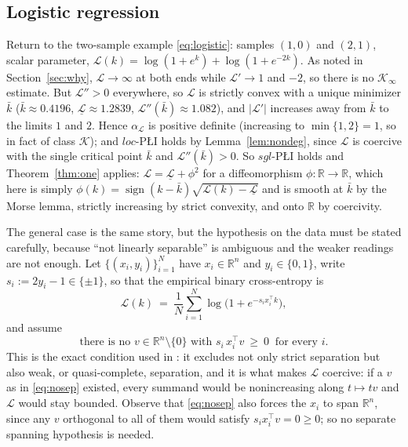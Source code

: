\documentclass[11pt]{article}
\theoremstyle{plain}
\theoremstyle{definition}
\theoremstyle{remark}
\newcommand{\R}{\mathbb{R}}
\begin{document}
\subsection{Logistic regression}

Return to the two-sample example \eqref{eq:logistic}: samples $(1,0)$ and
$(2,1)$, scalar parameter, $\mathcal{L}(k)=\log(1+e^k)+\log(1+e^{-2k})$. As noted
in Section~\ref{sec:why}, $\mathcal{L}\to\infty$ at both ends while
$\mathcal{L}'\to1$ and $-2$, so there is no $\mathcal{K}_\infty$ estimate. But
$\mathcal{L}''>0$ everywhere, so $\mathcal{L}$ is strictly convex with a unique
minimizer $\bar k$ ($\bar k\approx0.4196$,
$\underline{\mathcal{L}}\approx1.2839$, $\mathcal{L}''(\bar k)\approx1.082$), and
$|\mathcal{L}'|$ increases away from $\bar k$ to the limits $1$ and $2$. Hence
$\alpha_{\mathcal{L}}$ is positive definite (increasing to
$\min\{1,2\}=1$, so in fact of class $\mathcal{K}$); and $loc$-P\L{}I holds by
Lemma~\ref{lem:nondeg}, since $\mathcal{L}$ is coercive with the single critical
point $\bar k$ and $\mathcal{L}''(\bar k)>0$. So $sgl$-P\L{}I holds and
Theorem~\ref{thm:one} applies: $\mathcal{L}=\underline{\mathcal{L}}+\phi^2$ for a
diffeomorphism $\phi\colon\R\to\R$, which here is simply
$\phi(k)=\operatorname{sign}(k-\bar k)\sqrt{\mathcal{L}(k)-\underline{\mathcal{L}}}$
and is smooth at $\bar k$ by the Morse lemma, strictly increasing by strict
convexity, and onto $\R$ by coercivity.

The general case is the same story, but the hypothesis on the data must be stated
carefully, because ``not linearly separable'' is ambiguous and the weaker readings
are not enough. Let $\{(x_i,y_i)\}_{i=1}^N$ have $x_i\in\R^n$ and
$y_i\in\{0,1\}$, write $s_i := 2y_i-1\in\{\pm1\}$, so that the empirical binary
cross-entropy is
\[
  \mathcal{L}(k) \ =\ \frac1N\sum_{i=1}^N \log\bigl(1+e^{-s_i x_i^\top k}\bigr) ,
\]
and assume
\begin{equation}\label{eq:nosep}
  \text{there is no } v\in\R^n\setminus\{0\} \text{ with }
  s_i\,x_i^\top v \ \ge\ 0 \ \text{ for every } i .
\end{equation}
This is the exact condition used in \cite{CuiJiangSontag2026}: it excludes not
only strict separation but also weak, or quasi-complete, separation, and it is what
makes $\mathcal{L}$ coercive: if a $v$ as in \eqref{eq:nosep} existed, every
summand would be nonincreasing along $t\mapsto tv$ and $\mathcal{L}$ would stay
bounded. Observe that \eqref{eq:nosep} also forces the $x_i$ to span $\R^n$, since
any $v$ orthogonal to all of them would satisfy $s_ix_i^\top v=0\ge0$; so no
separate spanning hypothesis is needed.
\end{document}
